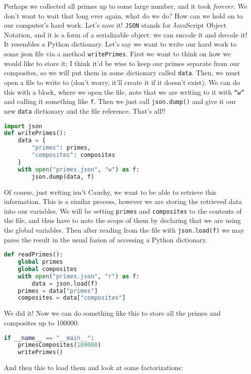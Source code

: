 \documentclass[12pt]{article}
\begin{document}
Perhaps we collected all primes up to some large number, and it took \textit{forever}. We don't want to wait that long ever again, what do we do? How can we hold on to our computer's hard work. Let's save it! \texttt{JSON} stands for JavaScript Object Notation, and it is a form of a serializable object: we can encode it and decode it! It resembles a Python dictionary. Let's say we want to write our hard work to some json file via a method \texttt{writePrimes}. First we want to think on how we would like to store it; I think it'd be wise to keep our primes separate from our composites, so we will put them in some dictionary called \texttt{data}. Then, we must open a file to write to (don't worry, it'll create it if it doesn't exist). We can do this with a block, where we open the file, note that we are writing to it with \texttt{``w''} and calling it something like \texttt{f}. Then we just call \texttt{json.dump()} and give it our new \texttt{data} dictionary and the file reference. That's all!!\\
\begin{lstlisting}[language=Python]
import json
def writePrimes():
    data = {
        "primes": primes,
        "composites": composites
    }
    with open("primes.json", "w") as f:
        json.dump(data, f)
\end{lstlisting}
Of course, just writing isn't Cauchy, we want to be able to retrieve this information. This is a similar process, however we are storing the retrieved data into our variables. We will be setting \texttt{primes} and \texttt{composites} to the contents of the file, and thus have to note the scope of them by declaring that we are using the global variables. Then after reading from the file with \texttt{json.load(f)} we may parse the result in the usual fasion of accessing a Python dictionary.\\
\begin{lstlisting}[language=Python]
def readPrimes():
    global primes
    global composites
    with open("primes.json", "r") as f:
        data = json.load(f)
    primes = data["primes"]
    composites = data["composites"]
\end{lstlisting}
We did it! Now we can do something like this to store all the primes and composites up to 100000:\\
\begin{lstlisting}[language=Python]
if __name__ == "__main__":
    primesComposites(100000)
    writePrimes()
\end{lstlisting}
And then this to load them and look at some factorizations:\\
\end{document}
